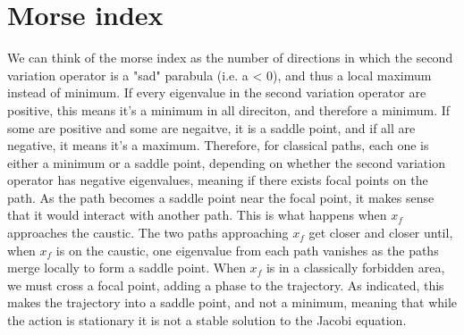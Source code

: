 \documentclass{article}
\begin{document}
\section{Morse index}
We can think of the morse index as the number of directions in which the second variation operator is a "sad" parabula (i.e. a < 0), and thus a local maximum instead of minimum. If every eigenvalue in the second variation operator are positive, this means it's a minimum in all direciton, and therefore a minimum. If some are positive and some are negaitve, it is a saddle point, and if all are negative, it means it's a maximum.
\newline
Therefore, for classical paths, each one is either a minimum or a saddle point, depending on whether the second variation operator has negative eigenvalues, meaning if there exists focal points on the path.
\newline
As the path becomes a saddle point near the focal point, it makes sense that it would interact with another path. This is what happens when $x_f$ approaches the caustic. The two paths approaching $x_f$ get closer and closer until, when $x_f$ is on the caustic, one eigenvalue from each path vanishes as the paths merge locally to form a saddle point.
\newline
When $x_f$ is in a classically forbidden area, we must cross a focal point, adding a phase to the trajectory. As indicated, this makes the trajectory into a saddle point, and not a minimum, meaning that while the action is stationary it is not a stable solution to the Jacobi equation.
\end{document}
